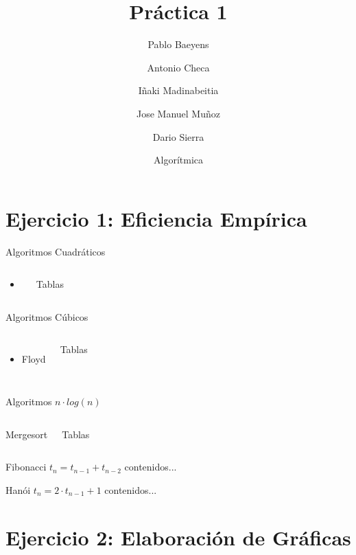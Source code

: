 \documentclass[10pt,compress,usetitleprogressbar,mathserif]{beamer}
\title{Práctica 1}
\author{Pablo Baeyens \and Antonio Checa \and Iñaki Madinabeitia \and Jose Manuel Muñoz \and Dario Sierra}
\date{Algorítmica}
\begin{document}
\maketitle
\section{Ejercicio 1: \large{Eficiencia Empírica }}
\begin{frame}{Algoritmos Cuadráticos}
\begin{columns}[c]
		\begin{itemize}
			\item	{}
		\end{itemize}
		
	Tablas
\end{columns}	
\end{frame}

\begin{frame}{Algoritmos Cúbicos}
	\begin{columns}[c]
		\begin{itemize}
			\item \Large{Floyd}
		\end{itemize}
		Tablas
	\end{columns}
\end{frame}


\begin{frame}{Algoritmos $n\cdot log(n)$}
	\begin{columns}[c]

	\Large{Mergesort}
		
		Tablas
	\end{columns}	
\end{frame}

\begin{frame}{Fibonacci $t_n=t_{n-1}+t_{n-2}$}
	contenidos...
\end{frame}

\begin{frame}{Hanói $t_n=2 \cdot t_{n-1}+1 $}
	contenidos...
\end{frame}

\section{Ejercicio 2: Elaboración de Gráficas}
\end{document}

